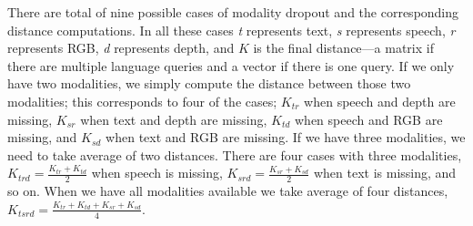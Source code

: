 \documentclass[sigconf,natbib=true,anonymous=true]{acmart}
\begin{document}
There are total of nine possible cases of modality dropout and the corresponding distance computations. In all these cases \textit{t} represents text, \textit{s} represents speech, \textit{r} represents RGB, \textit{d} represents depth, and $K$ is the final distance---a matrix if there are multiple language queries and a vector if there is one query.
If we only have two modalities, we simply compute the distance between those two modalities; this corresponds to four of the cases; $K_{tr}$ when speech and depth are missing, $K_{sr}$ when text and depth are missing, $K_{td}$ when speech and RGB are missing, and $K_{sd}$ when text and RGB are missing. If we have three modalities, we need to take average of two distances. There are four cases with three modalities, $K_{trd} = \frac{K_{tr} + K_{td}}{2}$ when speech is missing, $K_{srd} = \frac{K_{sr} + K_{sd}}{2}$ when text is missing, 
and so on.
When we have all modalities available we take average of four distances, $K_{tsrd} = \frac{K_{tr}+ K_{td} +K_{sr} + K_{sd}}{4}$. 

\end{document}

